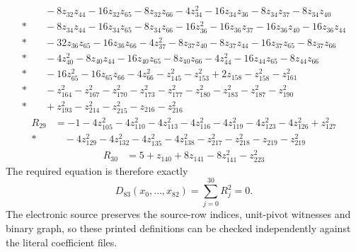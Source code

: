 \documentclass[11pt]{article}
\theoremstyle{remark}
\begin{document}
\begin{align*}
&\quad{}-8z_{32} z_{44}-16z_{32} z_{65}-8z_{32} z_{66}-4z_{34}^{2}-16z_{34} z_{36}-8z_{34} z_{37}-8z_{34} z_{40}\\*
&\quad{}-8z_{34} z_{44}-16z_{34} z_{65}-8z_{34} z_{66}-16z_{36}^{2}-16z_{36} z_{37}-16z_{36} z_{40}-16z_{36} z_{44}\\*
&\quad{}-32z_{36} z_{65}-16z_{36} z_{66}-4z_{37}^{2}-8z_{37} z_{40}-8z_{37} z_{44}-16z_{37} z_{65}-8z_{37} z_{66}\\*
&\quad{}-4z_{40}^{2}-8z_{40} z_{44}-16z_{40} z_{65}-8z_{40} z_{66}-4z_{44}^{2}-16z_{44} z_{65}-8z_{44} z_{66}\\*
&\quad{}-16z_{65}^{2}-16z_{65} z_{66}-4z_{66}^{2}-z_{145}^{2}-z_{153}^{2}+2z_{158}-z_{158}^{2}-z_{161}^{2}\\*
&\quad{}-z_{164}^{2}-z_{167}^{2}-z_{170}^{2}-z_{173}^{2}-z_{177}^{2}-z_{180}^{2}-z_{183}^{2}-z_{187}^{2}-z_{190}^{2}\\*
&\quad{}+z_{193}^{2}-z_{214}^{2}-z_{215}^{2}-z_{216}-z_{216}^{2}
\end{align*}
\begin{align*}
R_{29}&=-1-4z_{105}^{2}-4z_{110}^{2}-4z_{113}^{2}-4z_{116}^{2}-4z_{119}^{2}-4z_{123}^{2}-4z_{126}^{2}+z_{127}^{2}\\*
&\quad{}-4z_{129}^{2}-4z_{132}^{2}-4z_{135}^{2}-4z_{138}^{2}-z_{217}^{2}-z_{218}^{2}-z_{219}-z_{219}^{2}
\end{align*}
\begin{align*}
R_{30}&=5+z_{140}+8z_{141}-8z_{141}^{2}-z_{223}^{2}
\end{align*}
\endgroup
The required equation is therefore exactly
\[D_{83}(x_0,\ldots,x_{82})=\sum_{j=0}^{30}R_j^2=0.\]
The electronic source preserves the source-row indices, unit-pivot witnesses and binary graph, so these printed definitions can be checked independently against the literal coefficient files.

\end{document}
